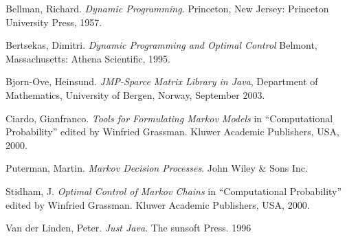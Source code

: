 \documentclass[11pt]{article}
\begin{document}
\begin{thebibliography}{Dillo 83}
 Bellman, Richard. \emph{Dynamic Programming}. Princeton, New Jersey: Princeton University Press, 1957.

 Bertsekas, Dimitri. \emph{Dynamic Programming and Optimal Control} Belmont, Massachusetts: Athena Scientific, 1995.

 Bjorn-Ove, Heinsund. \emph{JMP-Sparce Matrix Library in Java}, Department of Mathematics, University of Bergen, Norway, September 2003.

Ciardo, Gianfranco. \textit{Tools for Formulating Markov Models} in ``Computational Probability'' edited by Winfried Grassman. Kluwer Academic Publishers, USA, 2000.

 Puterman, Martin. \textit{Markov Decision Processes}. John Wiley \& Sons Inc.

 Stidham, J. \emph{Optimal Control of Markov Chains} in ``Computational Probability'' edited by Winfried Grassman. Kluwer Academic Publishers, USA, 2000.

 Van der Linden, Peter. \textit{Just Java}. The sunsoft
Press. 1996

\end{thebibliography}


\printindex
\end{document}
